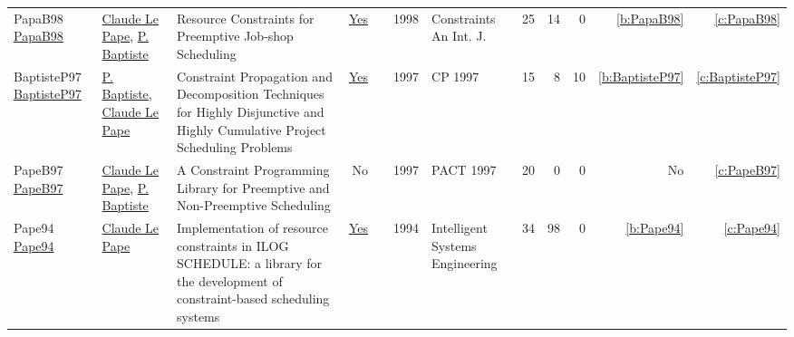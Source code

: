 {\begin{longtable}{>{\raggedright\arraybackslash}p{3cm}>{\raggedright\arraybackslash}p{6cm}>{\raggedright\arraybackslash}p{6.5cm}rrrp{2.5cm}rrrrr}
PapaB98 \href{https://doi.org/10.1023/A:1009723704757}{PapaB98} & \hyperref[auth:a165]{Claude Le Pape}, \hyperref[auth:a164]{P. Baptiste} & Resource Constraints for Preemptive Job-shop Scheduling & \href{../works/PapaB98.pdf}{Yes} & \cite{PapaB98} & 1998 & Constraints An Int. J. & 25 & 14 & 0 & \ref{b:PapaB98} & \ref{c:PapaB98}\\
BaptisteP97 \href{https://doi.org/10.1007/BFb0017454}{BaptisteP97} & \hyperref[auth:a164]{P. Baptiste}, \hyperref[auth:a165]{Claude Le Pape} & Constraint Propagation and Decomposition Techniques for Highly Disjunctive and Highly Cumulative Project Scheduling Problems & \href{../works/BaptisteP97.pdf}{Yes} & \cite{BaptisteP97} & 1997 & CP 1997 & 15 & 8 & 10 & \ref{b:BaptisteP97} & \ref{c:BaptisteP97}\\
PapeB97 \href{}{PapeB97} & \hyperref[auth:a165]{Claude Le Pape}, \hyperref[auth:a164]{P. Baptiste} & A Constraint Programming Library for Preemptive and Non-Preemptive Scheduling & No & \cite{PapeB97} & 1997 & PACT 1997 & 20 & 0 & 0 & No & \ref{c:PapeB97}\\
Pape94 \href{http://dx.doi.org/10.1049/ise.1994.0009}{Pape94} & \hyperref[auth:a165]{Claude Le Pape} & Implementation of resource constraints in ILOG SCHEDULE: a library for the development of constraint-based scheduling systems & \href{../works/Pape94.pdf}{Yes} & \cite{Pape94} & 1994 & Intelligent Systems Engineering & 34 & 98 & 0 & \ref{b:Pape94} & \ref{c:Pape94}\\
\end{longtable}
}

\clearpage
